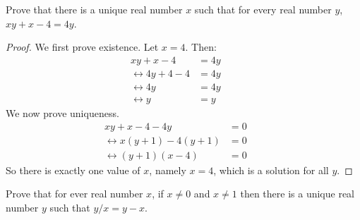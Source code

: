 \begin{tcolorbox}[title=Problem 2, breakable]
    Prove that there is a unique real number $x$ such that 
    for every real number $y$, $xy + x - 4 = 4y$.
\end{tcolorbox}

\begin{proof}
    We first prove existence. Let $x = 4$. Then:
    \begin{align*}
        xy + x - 4                 & = 4y &  &   \\
        \leftrightarrow 4y + 4 - 4 & = 4y &  &   \\
        \leftrightarrow 4y         & = 4y &  &   \\
        \leftrightarrow y          & = y  &  & 
    \end{align*}
    We now prove uniqueness.
    \begin{align*}
        xy + x - 4 - 4y                     & = 0 &  &   \\
        \leftrightarrow x(y + 1) - 4(y + 1) & = 0 &  &   \\
        \leftrightarrow (y + 1)(x - 4)      & = 0 &  & 
    \end{align*}
    So there is exactly one value of $x$, namely $x = 4$, which is a solution for all $y$.
\end{proof}

\begin{tcolorbox}[title=Problem 3, breakable]
    Prove that for ever real number $x$, if $x \not = 0$ and $x \not = 1$
    then there is a unique real number $y$ such that $y/x = y - x$.
\end{tcolorbox}

